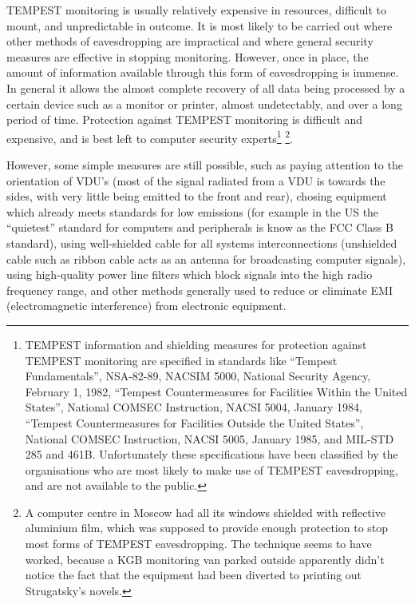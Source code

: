 TEMPEST monitoring is usually relatively expensive in resources, difficult to \linebreak
mount, and unpredictable in outcome.  It is most likely to be carried out where 
other methods of eavesdropping are impractical and where general security 
measures are effective in stopping monitoring.  However, once in place, the 
amount of information available through this form of eavesdropping is immense.  
In general it allows the almost complete recovery of all data being processed 
by a certain device such as a monitor or printer, almost undetectably, and over 
a long period of time.  Protection against TEMPEST monitoring is difficult and 
expensive, and is best left to computer security experts\footnote{
		TEMPEST information and shielding measures for protection against
              	TEMPEST monitoring are specified in standards like ``Tempest
              	Fundamentals'', NSA-82-89, NACSIM 5000, National Security Agency,
              	February 1, 1982, ``Tempest Countermeasures for Facilities Within
              	the United States'', National COMSEC Instruction, NACSI 5004,
              	January 1984, ``Tempest Countermeasures for Facilities Outside the
              	United States'', National COMSEC Instruction, NACSI 5005, January
              	1985, and MIL-STD 285 and 461B.  Unfortunately these
              	specifications have been classified by the organisations who are
              	most likely to make use of TEMPEST eavesdropping, and are not
              	available to the public.
} \footnote{
               A computer centre in Moscow had all its windows shielded with
               reflective aluminium film, which was supposed to provide enough
               protection to stop most forms of TEMPEST eavesdropping.  The
               technique seems to have worked, because a KGB monitoring van
               parked outside apparently didn't notice the fact that the
               equipment had been diverted to printing out Strugatsky's novels.
}.

However, some simple measures are still possible, such as paying attention to
the orientation of VDU's (most of the signal radiated from a VDU is towards the
sides, with very little being emitted to the front and rear), chosing equipment
which already meets standards for low emissions (for example in the US the
``quietest'' standard for computers and peripherals is know as the FCC Class B
standard), using well-shielded cable for all systems interconnections
(unshielded cable such as ribbon cable acts as an antenna for broadcasting
computer signals), using high-quality power line filters which block signals
into the high radio frequency range, and other methods generally used to reduce
or eliminate EMI (electromagnetic interference) from electronic equipment.


